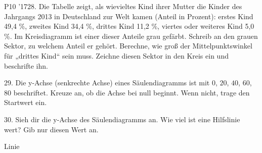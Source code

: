 \documentclass[11pt]{article}
\begin{document}
\pfgruppe{}
\begin{pfaufg}{P10 ’17}{28.}{}
Die Tabelle zeigt, als wievieltes Kind ihrer Mutter die Kinder des Jahrgangs 2013 in Deutschland zur Welt kamen (Anteil in Prozent): erstes Kind 49,4 \%, zweites Kind 34,4 \%, drittes Kind 11,2 \%, viertes oder weiteres Kind 5,0 \%. Im Kreisdiagramm ist einer dieser Anteile grau gefärbt. Schreib an den grauen Sektor, zu welchem Anteil er gehört. Berechne, wie groß der Mittelpunktswinkel für „drittes Kind“ sein muss. Zeichne diesen Sektor in den Kreis ein und beschrifte ihn.
\par\smallskip\noindent {}\par
{}
\end{pfaufg}
\pfgruppe{}
\begin{pfaufg}{}{29.}{}
Die y-Achse (senkrechte Achse) eines Säulendiagramms ist mit $0$, $20$, $40$, $60$, $80$ beschriftet. Kreuze an, ob die Achse bei null beginnt. Wenn nicht, trage den Startwert ein.
\end{pfaufg}
\begin{pfaufg}{}{30.}{}
Sieh dir die y-Achse des Säulendiagramms an. Wie viel ist eine Hilfslinie wert? Gib nur diesen Wert an.
\par\smallskip\noindent {}\par
\par\noindent \leerfeld[je]  Linie\par
{}
\end{pfaufg}
\pfgruppe{}
\end{document}
